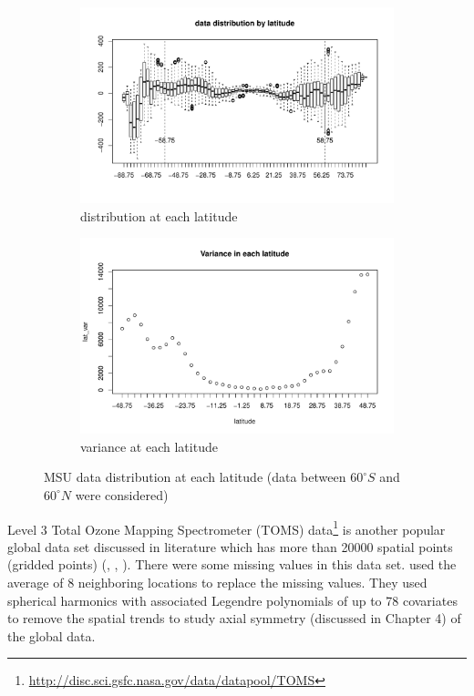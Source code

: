 \begin{figure}[H]
	\begin{subfigure}{.5\textwidth}
		\centering
		\includegraphics[width=1\linewidth]{graphs//MSU_data_latitude}
		\caption{distribution at each latitude}
		\label{MSU_data_latitude}
	\end{subfigure}
	\begin{subfigure}{.5\textwidth}
		\centering
		\includegraphics[width=1\linewidth]{graphs/MSU_data_var_lat}
		\caption{variance at each latitude}
		\label{MSU_data_var_lat}
	\end{subfigure}
	\caption[MSU Data Distribution at Each Latitude (Data Between $60^\circ S$ and $60^\circ N$]{MSU data distribution at each latitude (data between $60^\circ S$ and $60^\circ N$ were considered)}
	\label{compare_varigram_sim_2}
\end{figure}

Level 3 Total Ozone Mapping Spectrometer (TOMS) data\footnote{\url{http://disc.sci.gsfc.nasa.gov/data/datapool/TOMS}} is another popular global data set discussed in literature which has more than 20000 spatial points (gridded points) (\cite{Stein2007}, \cite{CressieJohannesson2008}, \cite{JunStein2008}). There were some missing values in this data set. \cite{Stein2007} used the average of 8 neighboring locations to replace the missing values. They used spherical harmonics with associated Legendre polynomials of up to 78 covariates to remove the spatial trends to study axial symmetry (discussed in Chapter 4) of the global data.

